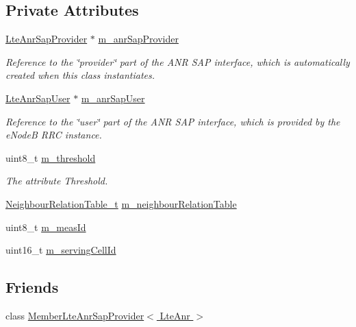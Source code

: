 \subsection*{Private Attributes}
\begin{DoxyCompactItemize}
\item 
\hyperlink{classns3_1_1LteAnrSapProvider}{Lte\+Anr\+Sap\+Provider} $\ast$ \hyperlink{classns3_1_1LteAnr_a5355c7d93e18c6297707280bcabebe15}{m\+\_\+anr\+Sap\+Provider}
\begin{DoxyCompactList}\small\item\em Reference to the \char`\"{}provider\char`\"{} part of the A\+NR S\+AP interface, which is automatically created when this class instantiates. \end{DoxyCompactList}\item 
\hyperlink{classns3_1_1LteAnrSapUser}{Lte\+Anr\+Sap\+User} $\ast$ \hyperlink{classns3_1_1LteAnr_a5bad60480cc567b130599b0077854a5b}{m\+\_\+anr\+Sap\+User}
\begin{DoxyCompactList}\small\item\em Reference to the \char`\"{}user\char`\"{} part of the A\+NR S\+AP interface, which is provided by the e\+NodeB R\+RC instance. \end{DoxyCompactList}\item 
uint8\+\_\+t \hyperlink{classns3_1_1LteAnr_a8583b924012fe4beea794d9e0be15492}{m\+\_\+threshold}
\begin{DoxyCompactList}\small\item\em The attribute Threshold. \end{DoxyCompactList}\item 
\hyperlink{classns3_1_1LteAnr_aac9b97c306ecc1d3d75ab85c32ba2bfc}{Neighbour\+Relation\+Table\+\_\+t} \hyperlink{classns3_1_1LteAnr_a90fc8417020463e795dc960f2f53bc24}{m\+\_\+neighbour\+Relation\+Table}
\item 
uint8\+\_\+t \hyperlink{classns3_1_1LteAnr_a59e92d899d5e105c0dad69d79310a844}{m\+\_\+meas\+Id}
\item 
uint16\+\_\+t \hyperlink{classns3_1_1LteAnr_a9a2e5aef479439b1f909f46f260f7092}{m\+\_\+serving\+Cell\+Id}
\end{DoxyCompactItemize}
\subsection*{Friends}
\begin{DoxyCompactItemize}
\item 
class \hyperlink{classns3_1_1LteAnr_a1884baf4c43e274dbe297cd3b594db70}{Member\+Lte\+Anr\+Sap\+Provider$<$ Lte\+Anr $>$}
\end{DoxyCompactItemize}
